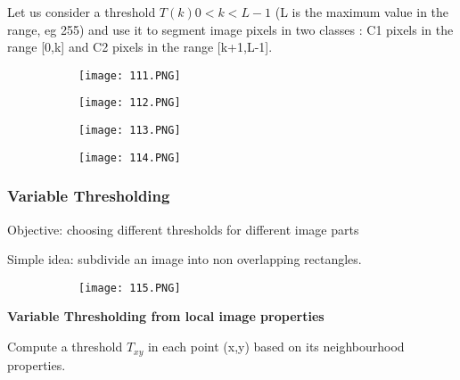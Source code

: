 \documentclass{article}
\begin{document}
Let us consider a threshold $T(k) 0 < k < L-1$ (L is the maximum value in the range, eg 255) and use it to segment image pixels in two classes : C1 pixels in the range [0,k] and C2 pixels in the range [k+1,L-1].


\begin{figure}[ht!]
  \centering
  \begin{subfigure}[b]{0.5\linewidth}
    \texttt{[image: 111.PNG]}
  \end{subfigure}
     \begin{subfigure}[b]{0.49\textwidth}
         \centering
         \texttt{[image: 112.PNG]}
     \end{subfigure}
\end{figure}


\begin{figure}[ht!]
  \centering
  \begin{subfigure}[b]{0.5\linewidth}
    \texttt{[image: 113.PNG]}
  \end{subfigure}
     \begin{subfigure}[b]{0.49\textwidth}
         \centering
         \texttt{[image: 114.PNG]}
     \end{subfigure}
\end{figure}

\vspace{10mm}

\subsubsection{Variable Thresholding}

Objective: choosing different thresholds for different image parts

Simple idea: subdivide an image into non overlapping rectangles.

\begin{figure}[ht!]
  \centering
  \begin{subfigure}[b]{0.7\linewidth}
    \texttt{[image: 115.PNG]}
  \end{subfigure}
\end{figure}

\textbf{Variable Thresholding from local image properties}

\vspace{5mm}

Compute a threshold $T_{xy}$ in each point (x,y) based on its neighbourhood properties.
\end{document}

